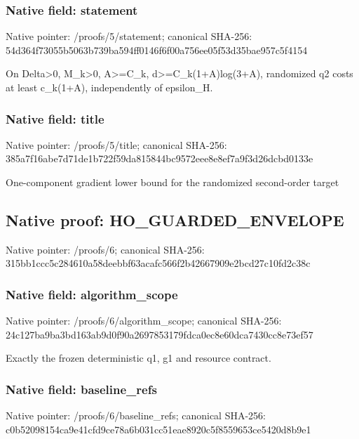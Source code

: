 \documentclass[10pt,a4paper]{article}
\begin{document}
\subsubsection{Native field: statement}
Native pointer: /proofs/5/statement; canonical SHA-256: 54d364f73055b5063b739ba594ff0146f6f00a756ee05f53d35bae957c5f4154

\begingroup\raggedright\sloppy On Delta>0,\allowbreak{} M\_\allowbreak{}k>0,\allowbreak{} A>=\allowbreak{}C\_\allowbreak{}k,\allowbreak{} d>=\allowbreak{}C\_\allowbreak{}k(1+A)log(3+A),\allowbreak{} randomized q2 costs at least c\_\allowbreak{}k(1+A),\allowbreak{} independently of epsilon\_\allowbreak{}H.\par\endgroup

\subsubsection{Native field: title}
Native pointer: /proofs/5/title; canonical SHA-256: 385a7f16abe7d71de1b722f59da815844bc9572eee8e8ef7a9f3d26dcbd0133e

\begingroup\raggedright\sloppy One-component gradient lower bound for the randomized second-order target\par\endgroup

\subsection{Native proof: HO\_\allowbreak{}GUARDED\_\allowbreak{}ENVELOPE}
Native pointer: /proofs/6; canonical SHA-256: 315bb1ccc5c284610a58deebbf63acafc566f2b42667909e2bcd27c10fd2c38c

\subsubsection{Native field: algorithm\_\allowbreak{}scope}
Native pointer: /proofs/6/algorithm\_\allowbreak{}scope; canonical SHA-256: 24c127ba9ba3bd163ab9d0f90a2697853179fdca0ec8e60dca7430cc8e73ef57

\begingroup\raggedright\sloppy Exactly the frozen deterministic q1,\allowbreak{} g1 and resource contract.\par\endgroup

\subsubsection{Native field: baseline\_\allowbreak{}refs}
Native pointer: /proofs/6/baseline\_\allowbreak{}refs; canonical SHA-256: c0b52098154ca9e41cfd9ce78a6b031cc51eae8920c5f8559653ce5420d8b9e1
\end{document}
